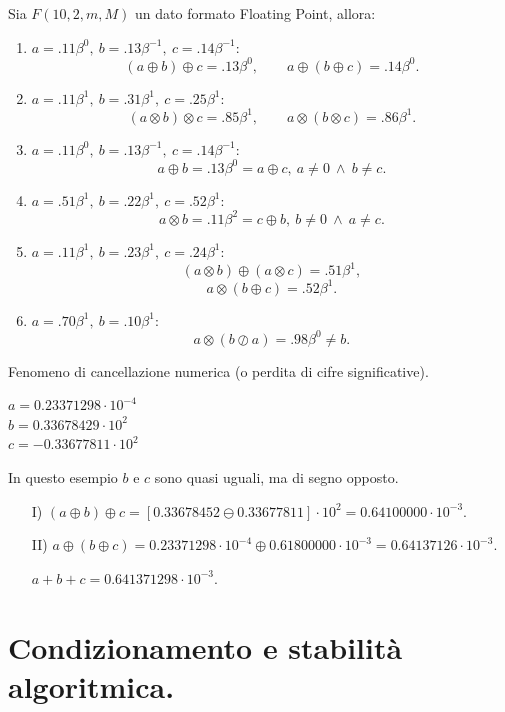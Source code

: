 \begin{exe}
Sia $F(10,2,m,M)$ un dato formato Floating Point, allora:
\begin{enumerate}
\item $a = .11\beta^0,\ b = .13\beta^{-1}, \ c = .14\beta^{-1}$:
\[(a \oplus b) \oplus c = .13\beta^0, \qquad a \oplus (b \oplus c) = .
14\beta^0.\]
\item $a = .11\beta^1,\ b = .31\beta^{1}, \ c = .25\beta^{1}$:
\[(a \otimes b) \otimes c = .85\beta^1, \qquad a \otimes (b \otimes c) = .
86\beta^1.\]
\item $a = .11\beta^0,\ b = .13\beta^{-1}, \ c = .14\beta^{-1}$:
\[a \oplus b = .13\beta^0 = a \oplus c, \ a \neq 0 \ \wedge\ b \neq c.\]
\item $a = .51\beta^1,\ b = .22\beta^{1}, \ c = .52\beta^{1}$:
\[a \otimes b = .11\beta^2 = c \oplus b, \ b \neq 0 \ \wedge\ a \neq c.\]
\item $a = .11\beta^1,\ b = .23\beta^{1}, \ c = .24\beta^{1}$:
\[(a \otimes b) \oplus (a \otimes c) = .51\beta^1,\]
\[a \otimes ( b \oplus c) = .52\beta^1.\]
\item $a = .70\beta^1, \ b = .10\beta^1$:
\[a \otimes (b \oslash a) = .98\beta^0 \neq b.\]
\end{enumerate}
\end{exe}

\begin{osse}
Fenomeno di cancellazione numerica (o perdita di cifre significative).
\begin{flushleft}
$a = 0.23371298 \cdot 10^{-4}$\\
$b = 0.33678429 \cdot 10^{2}$\\
$c = -0.33677811 \cdot 10^{2}$
\end{flushleft}
In questo esempio $b$ e $c$ sono quasi uguali, ma di segno opposto.
\begin{itemize}
\item[I)]
$(a \oplus b) \oplus c = [0.33678452 \ominus 0.33677811] \cdot 10^2 =
0.64100000 \cdot 10^{-3}$.
\item[II)]
$a \oplus (b \oplus c) = 0.23371298 \cdot 10^{-4} \oplus 0.61800000 \cdot 
10^{-3} = 0.64137126 \cdot 10^{-3}$.

\item[]$a + b + c = 0.641371298 \cdot 10^{-3}$.
\end{itemize}
\end{osse}


\chapter{Condizionamento e stabilità algoritmica.}

